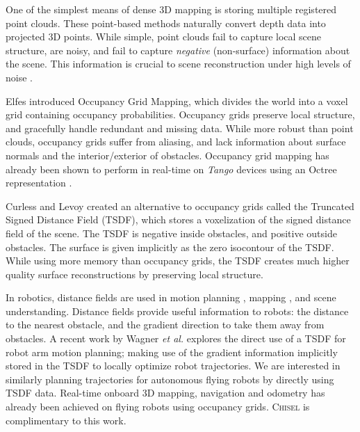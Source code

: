 \documentclass[conference]{IEEEtran}
\newcommand{\etal}{\textit{et al.}\xspace}
\newcommand{\Tango}{\textit{Tango}\xspace}
\newcommand{\TSDF}{TSDF\xspace}
\newcommand{\chisel}{\textsc{Chisel}\xspace}
\begin{document}
One of the simplest means of dense 3D mapping is storing multiple registered
point clouds. These point-based methods \cite{RusinkiewiczPoints,
TanskanenMetric, WeiseScanning, LSDSlam} naturally convert depth data into
projected 3D points. While simple, point clouds fail to capture local scene
structure, are noisy, and fail to capture \emph{negative} (non-surface)
information about the scene. This information is crucial to scene reconstruction
under high levels of noise \cite{Klingensmith2014}.

Elfes \cite{Elfes1989} introduced Occupancy Grid Mapping, which divides the
world into a voxel grid containing occupancy probabilities. Occupancy grids
preserve local structure, and gracefully handle redundant and missing data.  
While more robust than point clouds, occupancy grids suffer from aliasing, and
lack information about surface normals and the interior/exterior of obstacles. 
Occupancy grid mapping has already been shown to perform in real-time on \Tango
\cite{Tango} devices using an Octree representation \cite{Wurm2010}.


Curless and Levoy \cite{Curless1996} created an alternative to occupancy
grids called the Truncated Signed Distance Field (\TSDF), which stores a
voxelization of the signed distance field of the scene. The \TSDF is negative
inside obstacles, and positive outside obstacles. The surface is given
implicitly as the zero isocontour of the \TSDF. While using more memory
than occupancy grids, the \TSDF creates much higher quality surface
reconstructions by preserving local structure.

In robotics, distance fields are used in motion planning
\cite{RatliffChomp}, mapping \cite{VandapelKA05}, and scene understanding.
Distance fields provide useful information to robots: the distance to the
nearest obstacle, and the gradient direction to take them away from obstacles. 
A recent work by Wagner \etal \cite{WagnerICRA13} explores the direct use of a
\TSDF for robot arm motion planning; making use of the gradient information
implicitly stored in the \TSDF to locally optimize robot trajectories. We are
interested in similarly planning trajectories for autonomous flying robots by
directly using \TSDF data. Real-time onboard 3D mapping,
navigation and odometry has already been achieved on flying robots
\cite{FlyingNavigation, OSMAV}using occupancy grids. \chisel is
complimentary to this work.
\end{document}
